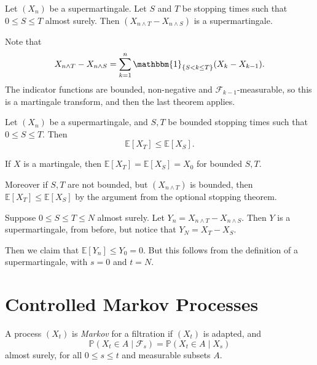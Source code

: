 \documentclass[12pt]{article}
\begin{document}
\begin{theorem}
	Let $(X_n)$ be a supermartingale. Let $S$ and $T$ be stopping times such that $0 \leq S \leq T$ almost surely. Then $(X_{n \wedge T} - X_{n \wedge S})$ is a supermartingale.
\end{theorem}

\begin{proofbox}
	Note that
	\[
		X_{n \wedge T} - X_{n \wedge S}= \sum_{k = 1}^n \mathbbm{1}_{\{S < k \leq T\}} (X_k - X_{k-1}).
	\]
	The indicator functions are bounded, non-negative and $\mathcal{F}_{k-1}$-measurable, so this is a martingale transform, and then the last theorem applies.
\end{proofbox}

\begin{theorem}
	Let $(X_n)$ be a supermartingale, and $S, T$ be bounded stopping times such that $0 \leq S \leq T$. Then
	\[
	\mathbb{E}[X_T] \leq \mathbb{E}[X_S].
	\]
\end{theorem}

\begin{remark}
	If $X$ is a martingale, then $\mathbb{E}[X_T] = \mathbb{E}[X_S] = X_0$ for bounded $S, T$.

	Moreover if $S, T$ are not bounded, but $(X_{n \wedge T})$ is bounded, then $\mathbb{E}[X_T] \leq \mathbb{E}[X_S]$ by the argument from the optional stopping theorem.
\end{remark}

\begin{proofbox}
	Suppose $0 \leq S \leq T \leq N$ almost surely. Let $Y_n = X_{n \wedge T} - X_{n \wedge S}$. Then $Y$ is a supermartingale, from before, but notice that $Y_N = X_T - X_S$.

	Then we claim that $\mathbb{E}[Y_n] \leq Y_0 = 0$. But this follows from the definition of a supermartingale, with $s = 0$ and $t = N$.
\end{proofbox}

\newpage

\section{Controlled Markov Processes}
\label{sec:cont}

\begin{definition}
	A process $(X_t)$ is \emph{Markov} for a filtration if $(X_t)$ is adapted, and
	\[
	\mathbb{P}(X_t \in A \mid \mathcal{F}_s) = \mathbb{P}(X_t \in A \mid X_s)
	\]
	almost surely, for all $0 \leq s \leq t$ and measurable subsets $A$.
\end{definition}
\end{document}
